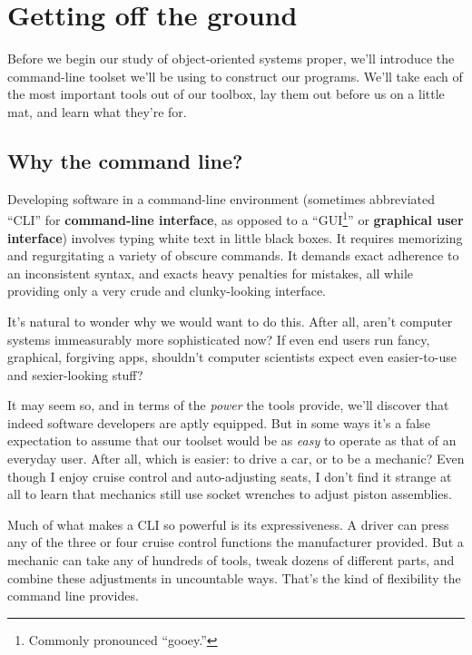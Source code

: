 
\chapter{Getting off the ground}
\label{ch:gettingOff}

Before we begin our study of object-oriented systems proper, we'll introduce
the command-line toolset we'll be using to construct our programs. We'll take
each of the most important tools out of our toolbox, lay them out before us on
a little mat, and learn what they're for.

\section{Why the command line?}

Developing software in a command-line environment (sometimes abbreviated
``CLI'' for \textbf{command-line interface}, as opposed to a
``GUI\footnote{Commonly pronounced ``gooey.''}'' or \textbf{graphical user
interface}) involves typing white text in little black boxes. It requires
memorizing and regurgitating a variety of obscure commands. It demands exact
adherence to an inconsistent syntax, and exacts heavy penalties for mistakes,
all while providing only a very crude and clunky-looking interface.

It's natural to wonder why we would want to do this. After all, aren't
computer systems immeasurably more sophisticated now? If even end users run
fancy, graphical, forgiving apps, shouldn't computer scientists expect even
easier-to-use and sexier-looking stuff?

It may seem so, and in terms of the \textit{power} the tools provide, we'll
discover that indeed software developers are aptly equipped. But in some ways
it's a false expectation to assume that our toolset would be as \textit{easy}
to operate as that of an everyday user. After all, which is easier: to drive a
car, or to be a mechanic? Even though I enjoy cruise control and
auto-adjusting seats, I don't find it strange at all to learn that mechanics
still use socket wrenches to adjust piston assemblies.

Much of what makes a CLI so powerful is its expressiveness. A driver can press
any of the three or four cruise control functions the manufacturer provided.
But a mechanic can take any of hundreds of tools, tweak dozens of different
parts, and combine these adjustments in uncountable ways. That's the kind of 
flexibility the command line provides.

